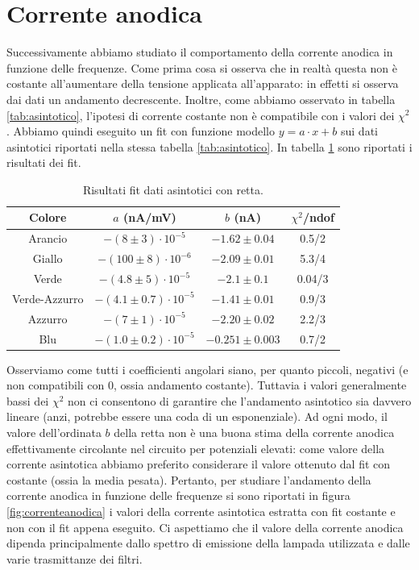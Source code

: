 \documentclass[10pt,a4paper]{article}
\begin{document}
\section{Corrente anodica}
Successivamente abbiamo studiato il comportamento della corrente anodica in funzione delle frequenze.
Come prima cosa si osserva che in realtà questa non è costante all'aumentare della tensione applicata all'apparato: in effetti si osserva dai dati un andamento decrescente. Inoltre, come abbiamo osservato in tabella \ref{tab:asintotico}, l'ipotesi di corrente costante non è compatibile con i valori dei $\chi ^2$. Abbiamo quindi eseguito un fit con funzione modello $y = a \cdot x + b$ sui dati asintotici riportati nella stessa tabella \ref{tab:asintotico}.
In tabella \ref{tab:fitasintoticoretta} sono riportati i risultati dei fit.
\begin{table}[!htb]
\centering
\begin{tabular}{|c|c|c|c|}
\hline
Colore & $a$ (nA/mV) & $b$ (nA) & $\chi ^2$/ndof\\
\hline
Arancio & $-(8\pm 3)\cdot 10 ^ {-5}$ & $-1.62 \pm 0.04$ & 0.5/2\\
\hline
Giallo & $-(100\pm 8)\cdot 10 ^ {-6}$ & $-2.09\pm0.01$ & 5.3/4\\
\hline
Verde & $-(4.8\pm 5)\cdot 10 ^ {-5}$ & $-2.1\pm 0.1$ & 0.04/3\\
\hline
Verde-Azzurro & $-(4.1\pm0.7)\cdot 10 ^ {-5}$ & $-1.41\pm0.01$ & 0.9/3\\
\hline
Azzurro & $-(7\pm 1)\cdot 10 ^ {-5}$ & $-2.20\pm 0.02$ & 2.2/3\\
\hline
Blu & $-(1.0\pm 0.2)\cdot 10 ^ {-5}$ & $-0.251\pm 0.003$ & 0.7/2\\ 
\hline
\end{tabular}
\caption{Risultati fit dati asintotici con retta.\label{tab:fitasintoticoretta}}
\end{table}
Osserviamo come tutti i coefficienti angolari siano, per quanto piccoli, negativi (e non compatibili con 0, ossia andamento costante).
Tuttavia i valori generalmente bassi dei $\chi ^2$ non ci consentono di garantire che l'andamento asintotico sia davvero lineare (anzi, potrebbe essere una coda di un esponenziale). 
Ad ogni modo, il valore dell'ordinata $b$ della retta non è una buona stima della corrente anodica effettivamente circolante nel circuito per potenziali elevati: come valore della corrente asintotica abbiamo preferito considerare il valore ottenuto dal fit con costante (ossia la media pesata). 
Pertanto, per studiare l'andamento della corrente anodica in funzione delle frequenze si sono riportati in figura \ref{fig:correnteanodica} i valori della corrente asintotica estratta con fit costante e non con il fit appena eseguito. Ci aspettiamo che il valore della corrente anodica dipenda principalmente dallo spettro di emissione della lampada utilizzata e dalle varie trasmittanze dei filtri.
\end{document}
